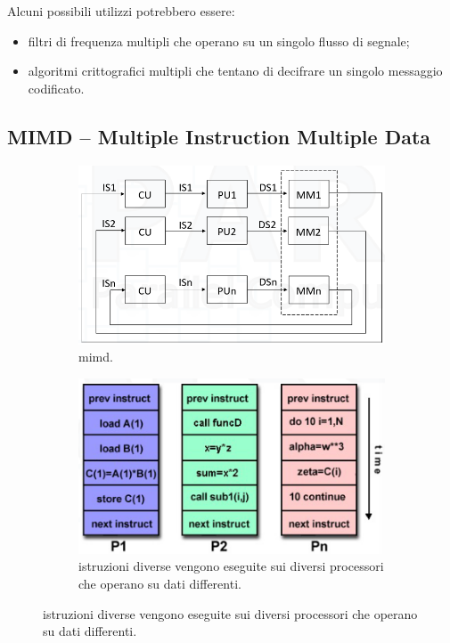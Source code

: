 Alcuni possibili utilizzi potrebbero essere:
\begin{itemize}
	\item filtri di frequenza multipli che operano su un singolo flusso di segnale;
	\item algoritmi crittografici multipli che tentano di decifrare un singolo
	messaggio codificato.
\end{itemize}

\subsection*{MIMD -- Multiple Instruction Multiple Data}
\begin{figure}[th]
	\begin{subfigure}{0.45\linewidth}
		\centering
		\includegraphics[width=\linewidth]{img/mimd}
		\caption{mimd.}
		\label{fig:mimd}
	\end{subfigure}
	\hfill
	\begin{subfigure}{0.45\linewidth}
		\centering
		\includegraphics[width=\linewidth]{img/mimd-processori}
		\caption{istruzioni diverse vengono eseguite sui diversi processori che operano su dati differenti.}
		\label{fig:mimd-processori}
	\end{subfigure}
\end{figure}

